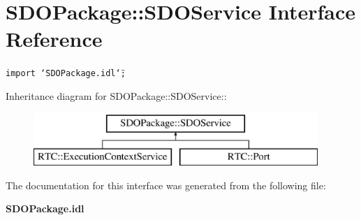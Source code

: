 \section{SDOPackage::SDOService Interface Reference}
\label{interfaceSDOPackage_1_1SDOService}
{\tt import \char`\"{}SDOPackage.idl\char`\"{};}

Inheritance diagram for SDOPackage::SDOService::\begin{figure}[H]
\begin{center}
\leavevmode
\includegraphics[height=2cm]{interfaceSDOPackage_1_1SDOService}
\end{center}
\end{figure}


The documentation for this interface was generated from the following file:\begin{CompactItemize}
\item 
{\bf SDOPackage.idl}\end{CompactItemize}
